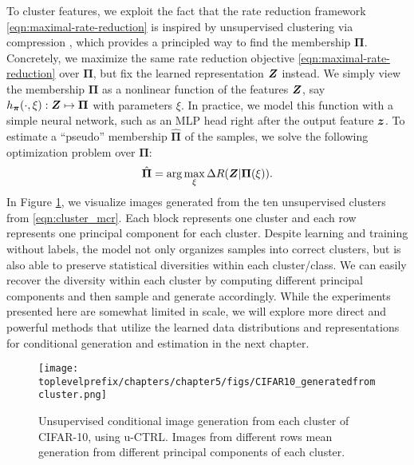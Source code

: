 \documentclass[../../book-main.tex]{subfiles}
\begin{document}
To cluster features, we exploit the fact that the rate reduction framework \eqref{eqn:maximal-rate-reduction} is inspired by unsupervised clustering via compression \cite{ma2007segmentation}, which provides a principled way to find the membership $\bm \Pi$.
Concretely, we maximize the same rate reduction objective \eqref{eqn:maximal-rate-reduction} over $\bm \Pi$, but fix the learned representation $\bm{Z}$ instead. We simply view the membership $\bm \Pi$ as a nonlinear function of the features $\bm{Z}$, say $h_{\bm \pi}(\cdot,\xi):\bm{Z} \mapsto \bm \Pi$ with parameters $\xi$. In practice, we model this function with a simple neural network, such as an MLP head right after the output feature $\bm{z}$. 
To estimate a ``pseudo'' membership $\hat{\bm \Pi}$ of the samples, we solve the following optimization problem over $\bm \Pi$:
\begin{align}
    \hat{\bm \Pi} = \arg\max_{\xi} \Delta R(\bm{Z}| \bm \Pi(\xi)).
\label{eqn:cluster_mcr}
\end{align}
In Figure \ref{fig:vis_clustering}, we  visualize images generated from the ten unsupervised clusters from \eqref{eqn:cluster_mcr}. Each block represents one cluster and each row represents one principal component for each cluster. Despite learning and training without labels, the model not only organizes samples into correct clusters, but is also able to preserve statistical diversities within each cluster/class. We can easily recover the diversity within each cluster by computing different principal components and then sample and generate accordingly. While the experiments presented here are somewhat limited in scale, we will explore more direct and powerful methods that utilize the learned data distributions and representations for conditional generation and estimation in the next chapter.
\begin{figure}[t]
    \footnotesize
    \centering
    \texttt{[image: \\toplevelprefix/chapters/chapter5/figs/CIFAR10\_generatedfromcluster.png]}
    \caption{\small Unsupervised conditional image generation from each cluster of CIFAR-10, using u-CTRL. Images from different rows mean generation from different principal components of each cluster.}
    \label{fig:vis_clustering}
\end{figure}




\end{document}
